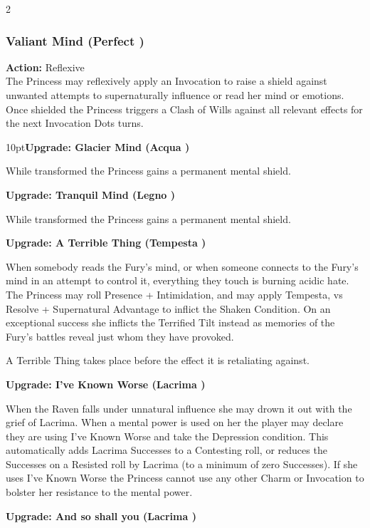 \begin{multicols}{2}
\subsubsection*{Valiant Mind (Perfect \textbullet)}

\noindent \textbf{Action:} Reflexive \\

\noindent The Princess may reflexively apply an Invocation to raise a shield against unwanted attempts to supernaturally influence or read her mind or emotions. Once shielded the Princess triggers a Clash of Wills against all relevant effects for the next Invocation Dots turns.

\begin{myindentpar}{10pt}\textbf{Upgrade: Glacier Mind (Acqua \textbullet\textbullet\textbullet\textbullet)}

While transformed the Princess gains a permanent mental shield. 

\textbf{Upgrade: Tranquil Mind (Legno \textbullet\textbullet\textbullet\textbullet)}

While transformed the Princess gains a permanent mental shield. 

\textbf{Upgrade: A Terrible Thing (Tempesta \textbullet\textbullet\textbullet)}

When somebody reads the Fury's mind, or when someone connects to the Fury's mind in an attempt to control it, everything they touch is burning acidic hate. The Princess may roll Presence + Intimidation, and may apply Tempesta, vs Resolve + Supernatural Advantage to inflict the Shaken Condition. On an exceptional success she inflicts the Terrified Tilt instead as memories of the Fury's battles reveal just whom they have provoked. 

A Terrible Thing takes place before the effect it is retaliating against. 

\textbf{Upgrade: I've Known Worse (Lacrima \textbullet\textbullet\textbullet)}

When the Raven falls under unnatural influence she may drown it out with the grief of Lacrima. When a mental power is used on her the player may declare they are using I've Known Worse and take the Depression condition. This automatically adds Lacrima Successes to a Contesting roll, or reduces the Successes on a Resisted roll by Lacrima (to a minimum of zero Successes). If she uses I've Known Worse the Princess cannot use any other Charm or Invocation to bolster her resistance to the mental power. 

\textbf{Upgrade: And so shall you (Lacrima \textbullet\textbullet\textbullet\textbullet\textbullet)}


\end{myindentpar}
\end{multicols}
